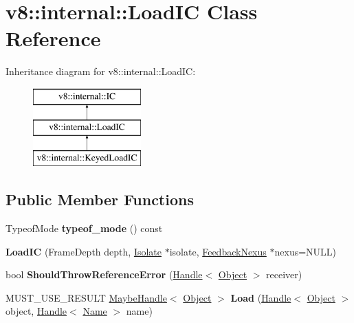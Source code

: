 \hypertarget{classv8_1_1internal_1_1_load_i_c}{}\section{v8\+:\+:internal\+:\+:Load\+IC Class Reference}
\label{classv8_1_1internal_1_1_load_i_c}
Inheritance diagram for v8\+:\+:internal\+:\+:Load\+IC\+:\begin{figure}[H]
\begin{center}
\leavevmode
\includegraphics[height=3.000000cm]{classv8_1_1internal_1_1_load_i_c}
\end{center}
\end{figure}
\subsection*{Public Member Functions}
\begin{DoxyCompactItemize}
\item 
Typeof\+Mode {\bfseries typeof\+\_\+mode} () const \hypertarget{classv8_1_1internal_1_1_load_i_c_aabfac4aebd82b7b3dbf1839504935231}{}\label{classv8_1_1internal_1_1_load_i_c_aabfac4aebd82b7b3dbf1839504935231}

\item 
{\bfseries Load\+IC} (Frame\+Depth depth, \hyperlink{classv8_1_1internal_1_1_isolate}{Isolate} $\ast$isolate, \hyperlink{classv8_1_1internal_1_1_feedback_nexus}{Feedback\+Nexus} $\ast$nexus=N\+U\+LL)\hypertarget{classv8_1_1internal_1_1_load_i_c_ad3cef6af89806e83b84c7bb90e18d3d4}{}\label{classv8_1_1internal_1_1_load_i_c_ad3cef6af89806e83b84c7bb90e18d3d4}

\item 
bool {\bfseries Should\+Throw\+Reference\+Error} (\hyperlink{classv8_1_1internal_1_1_handle}{Handle}$<$ \hyperlink{classv8_1_1internal_1_1_object}{Object} $>$ receiver)\hypertarget{classv8_1_1internal_1_1_load_i_c_a7d5b31c8481883a842619a3448227556}{}\label{classv8_1_1internal_1_1_load_i_c_a7d5b31c8481883a842619a3448227556}

\item 
M\+U\+S\+T\+\_\+\+U\+S\+E\+\_\+\+R\+E\+S\+U\+LT \hyperlink{classv8_1_1internal_1_1_maybe_handle}{Maybe\+Handle}$<$ \hyperlink{classv8_1_1internal_1_1_object}{Object} $>$ {\bfseries Load} (\hyperlink{classv8_1_1internal_1_1_handle}{Handle}$<$ \hyperlink{classv8_1_1internal_1_1_object}{Object} $>$ object, \hyperlink{classv8_1_1internal_1_1_handle}{Handle}$<$ \hyperlink{classv8_1_1internal_1_1_name}{Name} $>$ name)\hypertarget{classv8_1_1internal_1_1_load_i_c_a6f5824f411ac14f831a09a11e20c85b3}{}\label{classv8_1_1internal_1_1_load_i_c_a6f5824f411ac14f831a09a11e20c85b3}

\end{DoxyCompactItemize}
